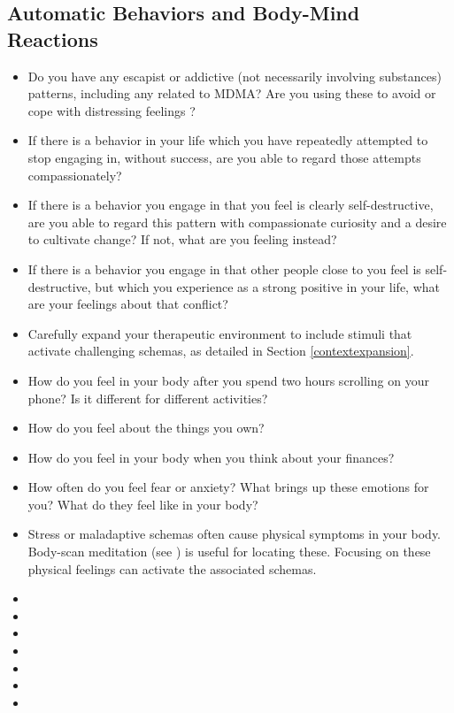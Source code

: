 \documentclass[12pt,letterpaper]{book}
\begin{document}
\subsection*{Automatic Behaviors and Body-Mind Reactions}
\begin{itemize}
    \item Do you have any escapist or addictive (not necessarily involving substances) patterns, including any related to MDMA? Are you using these to avoid or cope with distressing feelings \cite{forsterTraumaAddiction,alaviBehavioralAddiction}?
    \item If there is a behavior in your life which you have repeatedly attempted to stop engaging in, without success, are you able to regard those attempts compassionately?
    \item If there is a behavior you engage in that you feel is clearly self-destructive, are you able to regard this pattern with compassionate curiosity and a desire to cultivate change? If not, what are you feeling instead?
    \item If there is a behavior you engage in that other people close to you feel is self-destructive, but which you experience as a strong positive in your life, what are your feelings about that conflict?
    \item Carefully expand your therapeutic environment to include stimuli that activate challenging schemas, as detailed in Section \ref{contextexpansion}.
    \item How do you feel in your body after you spend two hours scrolling on your phone? Is it different for different activities?
    \item How do you feel about the things you own?
    \item How do you feel in your body when you think about your finances?
    \item How often do you feel fear or anxiety? What brings up these emotions for you? What do they feel like in your body?
    \item Stress or maladaptive schemas often cause physical symptoms in your body. Body-scan meditation (see \textcite{bodyscan}) is useful for locating these. Focusing on these physical feelings can activate the associated schemas.
\end{itemize}

\begin{itemize}
    \item {}
    \item {}
    \item {}
    \item {}
    \item {}
    \item {}
    \item {}
\end{itemize}
\end{document}
